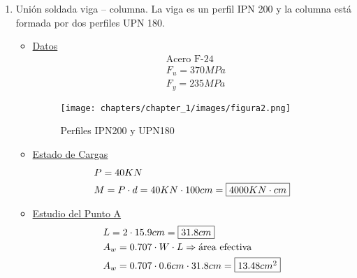 \begin{enumerate}
\item Unión soldada viga – columna. La viga es un perfil IPN 200 y la columna está
formada por dos perfiles UPN 180.
\begin{itemize}
\item \underline{Datos}
\begin{align*}
& \text{Acero F-24}\\
& F_u = 370MPa\\
& F_y = 235MPa
\end{align*}

\begin{figure}[H]
\begin{center}
     \texttt{[image: chapters/chapter\_1/images/figura2.png]}
\end{center}
\caption{Perfiles IPN200 y UPN180}
\end{figure}

\item \underline{Estado de Cargas}
\begin{align*}
& P = 40KN \\
& M = P \cdot d = 40KN \cdot 100cm = \framebox{$4000 KN \cdot cm$}
\end{align*}

\item \underline{Estudio del Punto A}
\begin{align*}
& L = 2 \cdot 15.9cm = \framebox{$31.8cm$} \\
& A_w = 0.707 \cdot W \cdot L \Rightarrow \text{área efectiva} \\
& A_w = 0.707 \cdot 0.6 cm \cdot 31.8cm = \framebox{$13.48 cm^2$} \\
\end{align*}

\end{itemize}
\end{enumerate}